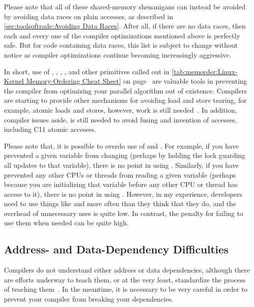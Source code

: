 Please note that all of these shared-memory shenanigans can instead be
avoided by avoiding data races on plain accesses, as described in
\cref{sec:toolsoftrade:Avoiding Data Races}.
After all, if there are no data races, then each and every one of the
compiler optimizations mentioned above is perfectly safe.
But for code containing data races, this list is subject to change
without notice as compiler optimizations continue becoming increasingly
aggressive.

In short, use of , , ,
, and other primitives called out in
\cref{tab:memorder:Linux-Kernel Memory-Ordering Cheat Sheet}
on
page~\pageref{tab:memorder:Linux-Kernel Memory-Ordering Cheat Sheet}
are valuable tools in preventing the compiler from
optimizing your parallel algorithm out of existence.
Compilers are starting to provide other mechanisms for avoiding
load and store tearing, for example, 
atomic loads and stores, however, work is still
needed~\cite{JonathanCorbet2016C11atomics}.
In addition, compiler issues aside,  is still needed
to avoid fusing and invention of accesses, including C11 atomic accesses.

Please note that, it is possible to overdo use of  and
.
For example, if you have prevented a given variable from changing
(perhaps by holding the lock guarding all updates to that
variable), there is no point in using .
Similarly, if you have prevented any other CPUs or threads from
reading a given variable (perhaps because you are initializing
that variable before any other CPU or thread has access to it),
there is no point in using .
However, in my experience, developers need to use things like
 and  more often than they think that
they do, and the overhead of unnecessary uses is quite low.
In contrast, the penalty for failing to use them when needed can be quite high.

\subsection{Address- and Data-Dependency Difficulties}
\label{sec:memorder:Address- and Data-Dependency Difficulties}

Compilers do not understand either address or data dependencies,
although there are efforts underway to teach them, or at the very
least, standardize the process of teaching
them~\cite{PaulEMcKennneyConsumeP0190R4,PaulEMcKenney2017markconsumeP0462R1}.
In the meantime, it is necessary to be very careful in order to prevent
your compiler from breaking your dependencies.

